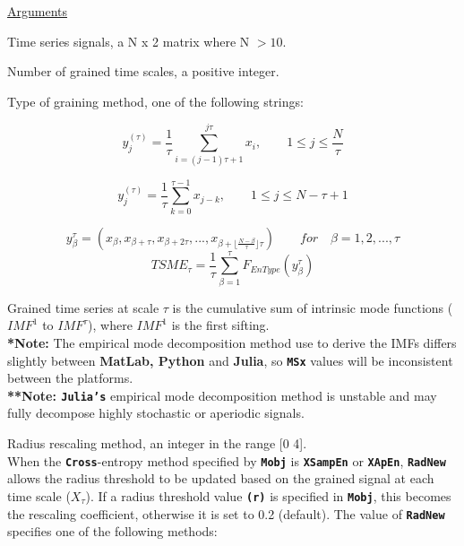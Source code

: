 \documentclass[12pt, a4paper, titlepage, openany]{book}
\begin{document}
\noindent \ul{Arguments}
\begin{description}[labelsep=1cm, labelwidth=2cm, nosep, style=multiline,leftmargin=3cm]\footnotesize
\item[\texttt{Sig}]		Time series signals, a N x 2 matrix where N $> 10$.
\item[\texttt{Scales}]		Number of grained time scales, a positive integer.
\item[\texttt{Methodx}]		Type of graining method, one of the following strings:
	\begin{description}[labelsep=8em, labelwidth=10em, nosep,style=multiline,leftmargin=3cm]
	\item[\texttt{"coarse"}]	\cite{MS1}
	\[y^{(\tau)}_{j} = \frac{1}{\tau} \sum^{j\tau}_{i=(j-1)\tau+1} x_{i},\qquad  1\leq j\leq \frac{N}{\tau}\] 
	\item[\texttt{"modified"}]	
	\[y^{(\tau)}_{j} = \frac{1}{\tau} \sum^{\tau-1}_{k=0} x_{j-k},	\qquad  1\leq j\leq N-\tau+1 \]		
	\item[\texttt{"timeshift"}] \cite{MS10}
	\[y^{\tau}_{\beta} = (x_{\beta}, x_{\beta+\tau}, x_{\beta+2\tau}, ... ,
	 x_{\beta+\lfloor\frac{N-\beta}{\tau}\rfloor \tau})  \qquad for \quad \beta  = 1, 2, ..., \tau \]
	\[TSME_{\tau} = \frac{1}{\tau}\sum^{\tau}_{\beta=1} F_{EnType}(y^{\tau}_{\beta}) \]
	\item[\texttt{"imf"}]	Grained time series at scale $ \tau $ is the cumulative sum of 							intrinsic mode 	functions ($ IMF^1 $ to $ IMF^\tau $), where $ IMF^1 $ is the first sifting. \cite{MS6}\\
		\textbf{*Note:} The empirical mode decomposition method use to derive the IMFs 									differs slightly between \textbf{MatLab, Python} and \textbf{Julia}, so 						\textbf{\texttt{MSx}} values will be inconsistent between the platforms. \\						\textbf{**Note: \texttt{Julia's}} empirical mode decomposition method is 												unstable and may fully decompose highly stochastic or aperiodic signals.\\
	\end{description}
\item[\texttt{RadNew}]			Radius rescaling method, an integer in the range [0 4].\\
				 When the \texttt{\textbf{Cross}}-entropy method specified by \texttt{\textbf{Mobj}} is \texttt{\textbf{XSampEn}} or \texttt{\textbf{XApEn}}, \texttt{\textbf{RadNew}} allows the radius threshold to be updated based on the grained signal at each time scale ($X_\tau$). If a radius threshold value \texttt{\textbf{(r)}} is specified in \texttt{\textbf{Mobj}},  this becomes the rescaling coefficient, otherwise it is set to 0.2 (default). The value of \texttt{\textbf{RadNew}} specifies one of the following methods:

\end{description}
\end{document}
